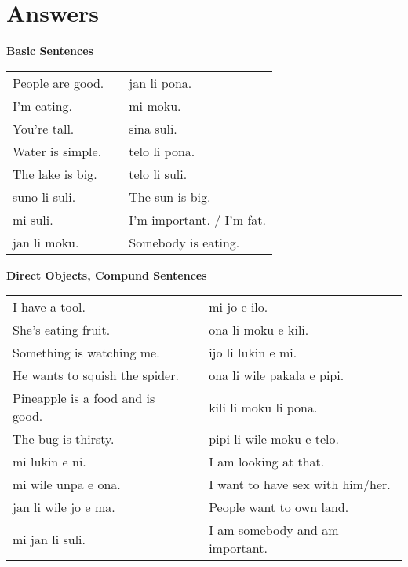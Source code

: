 \section{Answers}
\textbf{Basic Sentences} 
\label{'basic_sentences'}

\begin{supertabular}{p{5,5cm}|ll}
People are good. && jan li pona. \\ %
I'm eating. && mi moku. \\ %
You're tall. && sina suli. \\ %
Water is simple. && telo li pona. \\ %
The lake is big. && telo li suli. \\ %
suno li suli. && The sun is big. \\
mi suli. && I'm important. / I'm fat. \\
jan li moku. && Somebody is eating. \\
\end{supertabular} 

\textbf{Direct Objects, Compund Sentences} 
\label{'direct_objects_compund_sentences'}

\begin{supertabular}{p{5,5cm}|ll}
I have a tool. && mi jo e ilo. \\ %
She's eating fruit. && ona li moku e kili. \\ %
Something is watching me. && ijo li lukin e mi. \\ %
He wants to squish the spider. && ona li wile pakala e pipi. \\ %
Pineapple is a food and is good. && kili li moku li pona. \\ %
The bug is thirsty. && pipi li wile moku e telo. \\ %
mi lukin e ni. && I am looking at that. \\
mi wile unpa e ona. && I want to have sex with him/her.  \\
jan li wile jo e ma. && People want to own land. \\
mi jan li suli. && I am somebody and am important. \\
\end{supertabular} 

